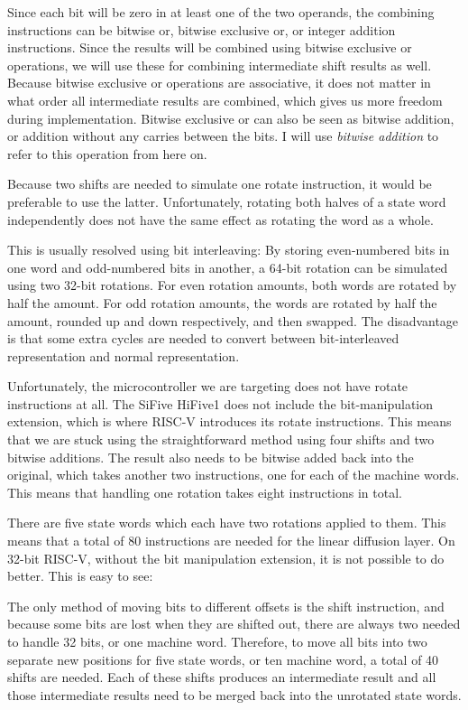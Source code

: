 Since each bit will be zero in at least one of the two operands, the combining
instructions can be bitwise or, bitwise exclusive or, or integer addition
instructions. Since the results will be combined using bitwise exclusive or
operations, we will use these for combining intermediate shift results as well.
Because bitwise exclusive or operations are associative, it does not matter in
what order all intermediate results are combined, which gives us more freedom
during implementation. Bitwise exclusive or can also be seen as bitwise
addition, or addition without any carries between the bits. I will use
\emph{bitwise addition} to refer to this operation from here on.

Because two shifts are needed to simulate one rotate instruction, it would be
preferable to use the latter. Unfortunately, rotating both halves of a state
word independently does not have the same effect as rotating the word as a
whole.

This is usually resolved using bit interleaving: By storing even-numbered bits
in one word and odd-numbered bits in another, a 64-bit rotation can be simulated
using two 32-bit rotations. For even rotation amounts, both words are rotated by
half the amount. For odd rotation amounts, the words are rotated by half the
amount, rounded up and down respectively, and then swapped. The disadvantage is
that some extra cycles are needed to convert between bit-interleaved
representation and normal representation.

Unfortunately, the microcontroller we are targeting does not have rotate
instructions at all. The SiFive HiFive1 does not include the bit-manipulation
extension, which is where RISC-V introduces its rotate instructions. This means
that we are stuck using the straightforward method using four shifts and two
bitwise additions. The result also needs to be bitwise added back into the
original, which takes another two instructions, one for each of the machine
words. This means that handling one rotation takes eight instructions in total.

There are five state words which each have two rotations applied to them. This
means that a total of 80 instructions are needed for the linear diffusion layer. On
32-bit RISC-V, without the bit manipulation extension, it is not possible to do
better. This is easy to see:

The only method of moving bits to different offsets is the shift instruction,
and because some bits are lost when they are shifted out, there are always two
needed to handle 32 bits, or one machine word. Therefore, to move all bits into
two separate new positions for five state words, or ten machine word, a total of
40 shifts are needed. Each of these shifts produces an intermediate result and
all those intermediate results need to be merged back into the unrotated state
words.

